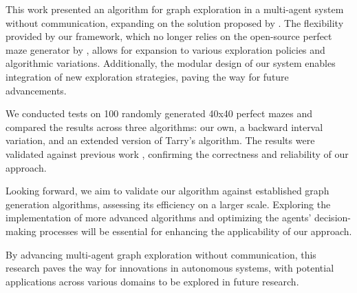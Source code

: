 This work presented an algorithm for graph exploration in a multi-agent system without communication, 
expanding on the solution proposed by .
The flexibility provided by our framework,
which no longer relies on the open-source perfect maze generator by ,
allows for expansion to various exploration policies and algorithmic variations.
Additionally, the modular design of our system enables integration of new exploration
strategies, paving the way for future advancements.

We conducted tests on 100 randomly generated 40x40 perfect mazes
and compared the results across three algorithms: 
our own, a backward interval variation, 
and an extended version of Tarry's algorithm. 
The results were validated against previous work \cite{Arthur2023},
confirming the correctness and reliability of our approach.

Looking forward, we aim to validate our algorithm
against established graph generation algorithms,
assessing its efficiency on a larger scale.
Exploring the implementation of more advanced algorithms
and optimizing the agents' decision-making processes will be essential
for enhancing the applicability of our approach.

By advancing multi-agent graph exploration without communication,
this research paves the way for innovations in autonomous systems,
with potential applications across various domains to be explored in future research.


